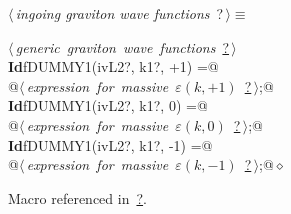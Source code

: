 \documentclass[a4paper,12pt]{amsart}
\renewcommand{\NWtarget}[2]{\hypertarget{#1}{#2}}
\renewcommand{\NWlink}[2]{\hyperlink{#1}{#2}}
\renewcommand{\NWtxtMacroRefIn}{Macro referenced in}
\renewcommand{\NWsep}{${\diamond}$}
\begin{document}
\begin{flushleft} \small
\begin{minipage}{\linewidth}\label{scrap41}\raggedright\small
\NWtarget{nuweb?}{} $\langle\,${\it ingoing graviton wave functions}\nobreak\ {\footnotesize {?}}$\,\rangle\equiv$
\vspace{-1ex}
\begin{list}{}{} \item
\mbox{}\verb@@\hbox{$\langle\,${\it generic graviton wave functions}\nobreak\ {\footnotesize \NWlink{nuweb?}{?}}$\,\rangle$}\verb@@\\
\mbox{}\verb@@\hbox{\sffamily\bfseries Id}\verb@ fDUMMY1(ivL2?, k1?, +1) =@\\
\mbox{}\verb@   @\hbox{$\langle\,${\it expression for massive $\varepsilon(k, +1)$}\nobreak\ {\footnotesize \NWlink{nuweb?}{?}}$\,\rangle$}\verb@;@\\
\mbox{}\verb@@\hbox{\sffamily\bfseries Id}\verb@ fDUMMY1(ivL2?, k1?, 0) =@\\
\mbox{}\verb@   @\hbox{$\langle\,${\it expression for massive $\varepsilon(k, 0)$}\nobreak\ {\footnotesize \NWlink{nuweb?}{?}}$\,\rangle$}\verb@;@\\
\mbox{}\verb@@\hbox{\sffamily\bfseries Id}\verb@ fDUMMY1(ivL2?, k1?, -1) =@\\
\mbox{}\verb@   @\hbox{$\langle\,${\it expression for massive $\varepsilon(k, -1)$}\nobreak\ {\footnotesize \NWlink{nuweb?}{?}}$\,\rangle$}\verb@;@{\NWsep}
\end{list}
\vspace{-1.5ex}
\footnotesize
\begin{list}{}{\setlength{\itemsep}{-\parsep}\setlength{\itemindent}{-\leftmargin}}
\item \NWtxtMacroRefIn\ \NWlink{nuweb?}{?}.

\item{}
\end{list}
\end{minipage}\vspace{4ex}
\end{flushleft}
\end{document}
